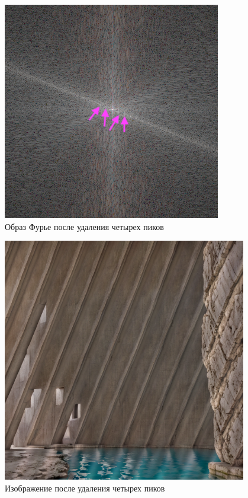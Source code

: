 \begin{figure}[ht!]
    \centering
    \includegraphics[width=\textwidth]{images/result/task_1/Fourier_8_modified_2_peaks.png}
    \caption{Образ Фурье после удаления четырех пиков}
    \label{fig:image_8_m2}
\end{figure}
\clearpage
\begin{figure}[ht!]
    \centering
    \includegraphics[width=0.95\textwidth]{images/result/task_1/result_8_2.png}
    \caption{Изображение после удаления четырех пиков}
    \label{fig:photo_8_m2}
\end{figure}

